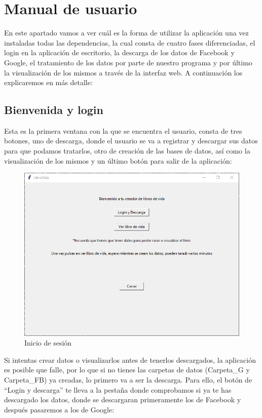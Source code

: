 \section{Manual de usuario}
 
En este apartado vamos a ver cuál es la forma de utilizar la aplicación una vez instaladas todas las dependencias, la cual consta de cuatro fases diferenciadas, el login en la aplicación de escritorio, la descarga de los datos de Facebook y Google, el tratamiento de los datos por parte de nuestro programa y por último la visualización de los mismos a través de la interfaz web. A continuación los explicaremos en más detalle:

\subsection{Bienvenida y login}
Esta es la primera ventana con la que se encuentra el usuario, consta de tres botones, uno de descarga, donde el usuario se va a registrar y descargar sus datos para que podamos tratarlos, otro de creación de las bases de datos, así como la visualización de los mismos y un último botón para salir de la aplicación:
 \begin{figure}
 	\begin{center}
 		\includegraphics[scale=0.7]{Imagenes/Fuentes/PantallaPrincipalOpciones.png} 
 		\caption{Inicio de sesión}
 		\label{PantallaPrincipalOpciones}
 	\end{center}
 \end{figure}
 
 Si intentas crear datos o visualizarlos antes de tenerlos descargados, la aplicación es posible que falle, por lo que si no tienes las carpetas de datos (Carpeta\_G y Carpeta\_FB) ya creadas, lo primero va a ser la descarga. Para ello, el botón de  ``Login y descarga'' te lleva a la pestaña donde comprobamos si ya te has descargado los datos, donde se descargaran primeramente los de Facebook y después pasaremos a los de Google: 
 
